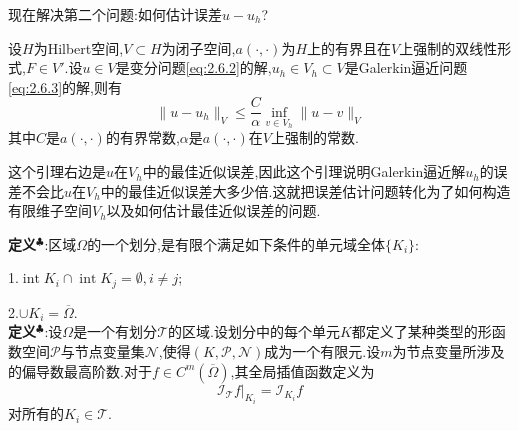 \documentclass{beamer}
\begin{document}
\begin{frame}
\small
现在解决第二个问题:如何估计误差$u-u_h$?
\begin{tcolorbox}[colback=white,colframe=njupt,title=\textbf{Céa引理},sharpish corners]
    设$H$为Hilbert空间,$V\subset H$为闭子空间,$a(\cdot,\cdot)$为$H$上的有界且在$V$上强制的双线性形式,$F\in V'$.设$u\in V$是变分问题\eqref{eq:2.6.2}的解,$u_h\in V_h\subset V$是Galerkin逼近问题\eqref{eq:2.6.3}的解,则有
    $$
    \|u-u_h\|_V\leqslant \frac{C}{\alpha}\inf_{v\in V_h}\|u-v\|_V
    $$
    其中$C$是$a(\cdot,\cdot)$的有界常数,$\alpha$是$a(\cdot,\cdot)$在$V$上强制的常数.
\end{tcolorbox}
这个引理右边是$u$在$V_h$中的最佳近似误差,因此这个引理说明Galerkin逼近解$u_h$的误差不会比$u$在$V_h$中的最佳近似误差大多少倍.这就把误差估计问题转化为了如何构造有限维子空间$V_h$以及如何估计最佳近似误差的问题.\par
\end{frame}

\begin{frame}
\small
\textbf{定义}$^\clubsuit $:区域$\Omega$的一个划分,是有限个满足如下条件的单元域全体$\{K_i\}$:\par
1.$\operatorname{int} K_i\cap\operatorname{int}K_j=\emptyset,i\neq j$;\par
2.$\cup K_i=\overline{\Omega}$.\\[8pt]
\textbf{定义}$^\clubsuit $:设$\Omega$是一个有划分$\mathcal{T}$的区域.设划分中的每个单元$K$都定义了某种类型的形函数空间$\mathcal{P}$与节点变量集$\mathcal{N}$,使得$(K,\mathcal{P},\mathcal{N})$成为一个有限元.设$m$为节点变量所涉及的偏导数最高阶数.对于$f\in C^m(\overline{\Omega})$,其全局插值函数定义为
$$
\mathcal{I}_{\mathcal{T}}f|_{K_i}=\mathcal{I}_{K_i} f
$$
对所有的$K_i\in\mathcal{T}$.\par
\end{frame}
\end{document}
